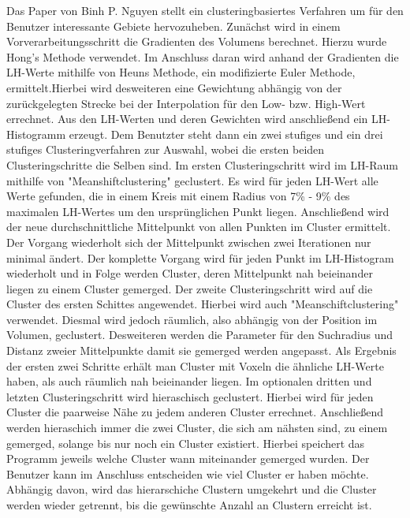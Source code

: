 Das Paper von Binh P. Nguyen \cite{nguyen2012clustering} stellt ein clusteringbasiertes Verfahren um für den Benutzer interessante Gebiete hervozuheben.
\newline
Zunächst wird in einem Vorverarbeitungsschritt die Gradienten des Volumens berechnet. Hierzu wurde Hong's Methode \cite{hong2003method} verwendet. Im Anschluss daran wird anhand der Gradienten die LH-Werte mithilfe von Heuns Methode, ein modifizierte Euler Methode, ermittelt.Hierbei wird desweiteren eine Gewichtung abhängig von der zurückgelegten Strecke bei der Interpolation für den Low- bzw. High-Wert errechnet. Aus den LH-Werten und deren Gewichten wird anschließend ein LH-Histogramm erzeugt.
\newline
Dem Benutzter steht dann ein zwei stufiges und ein drei stufiges Clusteringverfahren zur Auswahl, wobei die ersten beiden Clusteringschritte die Selben sind. 
Im ersten Clusteringschritt wird im LH-Raum mithilfe von "Meanshiftclustering" geclustert. Es wird für jeden LH-Wert alle Werte gefunden, die in einem Kreis mit einem Radius von 7\% - 9\%  des maximalen LH-Wertes um den ursprünglichen Punkt liegen. Anschließend wird der neue durchschnittliche Mittelpunkt von allen Punkten im Cluster ermittelt. Der Vorgang wiederholt sich der Mittelpunkt zwischen zwei Iterationen nur minimal ändert. Der komplette Vorgang wird für jeden Punkt im LH-Histogram wiederholt und in Folge werden Cluster, deren Mittelpunkt nah beieinander liegen zu einem Cluster gemerged.
\newline
Der zweite Clusteringschritt wird auf die Cluster des ersten Schittes angewendet. Hierbei wird auch "Meanschiftclustering" verwendet. Diesmal wird jedoch räumlich, also abhängig von der Position im Volumen, geclustert. Desweiteren werden die Parameter für den Suchradius und Distanz zweier Mittelpunkte damit sie gemerged werden angepasst.
\newline
Als Ergebnis der ersten zwei Schritte erhält man Cluster mit Voxeln die ähnliche LH-Werte haben, als auch räumlich nah beieinander liegen.
\newline
Im optionalen dritten und letzten Clusteringschritt wird hieraschisch geclustert. Hierbei wird für jeden Cluster die paarweise Nähe zu jedem anderen Cluster errechnet. Anschließend werden hieraschich immer die zwei Cluster, die sich am nähsten sind, zu einem gemerged, solange bis nur noch ein Cluster existiert.  Hierbei speichert das Programm jeweils welche Cluster wann miteinander gemerged wurden. Der Benutzer kann im Anschluss entscheiden wie viel Cluster er haben möchte. Abhängig davon, wird das hierarschiche Clustern umgekehrt und die Cluster werden wieder getrennt, bis die gewünschte Anzahl an Clustern erreicht ist.
